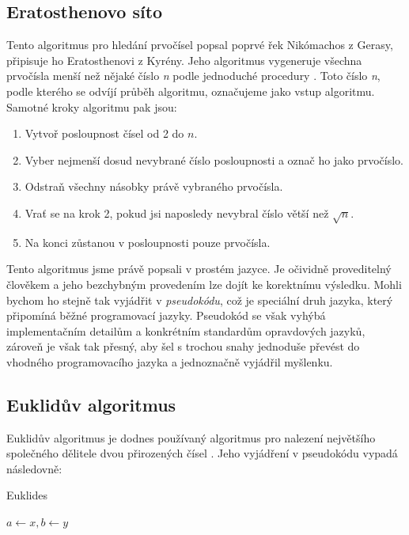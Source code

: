 \documentclass[12pt]{report}			%
\begin{document}
				\subsection{Eratosthenovo síto}
				Tento algoritmus pro hledání prvočísel popsal poprvé řek Nikómachos z Gerasy, připisuje ho Eratosthenovi z Kyrény. Jeho algoritmus vygeneruje všechna prvočísla menší než nějaké číslo \emph{n} podle jednoduché procedury \cite{history}. Toto číslo \emph{n}, podle kterého se odvíjí průběh algoritmu, označujeme jako vstup algoritmu. \\ Samotné kroky algoritmu pak jsou:
				\begin{enumerate}
				\item Vytvoř posloupnost čísel od 2 do $n$.
				\item Vyber nejmenší dosud nevybrané číslo posloupnosti a označ ho jako prvočíslo.
				\item Odstraň všechny násobky právě vybraného prvočísla.
				\item Vrať se na krok 2, pokud jsi naposledy nevybral číslo větší než $\sqrt{n}$.
				\item Na konci zůstanou v posloupnosti pouze prvočísla.
				
				\end{enumerate}
				Tento algoritmus jsme právě popsali v prostém jazyce. Je očividně proveditelný člověkem a jeho bezchybným provedením lze dojít ke korektnímu výsledku. Mohli bychom ho stejně tak vyjádřit v \emph{pseudokódu}, což je speciální druh jazyka, který připomíná běžné programovací jazyky. Pseudokód se však vyhýbá implementačním detailům a konkrétním standardům opravdových jazyků, zároveň je však tak přesný, aby šel s trochou snahy jednoduše převést do vhodného programovacího jazyka a jednoznačně vyjádřil myšlenku. \cite{pruvodce}
				\subsection{Euklidův algoritmus}
				Euklidův algoritmus je dodnes používaný algoritmus pro nalezení největšího společného dělitele dvou přirozených čísel \cite{pruvodce}. 
				Jeho vyjádření v pseudokódu vypadá následovně:
				
				\begin{algorithm}
			    \caption{Euklides}%
				$a\gets x, b\gets y$\;  				
				\end{algorithm}
				
\end{document}
